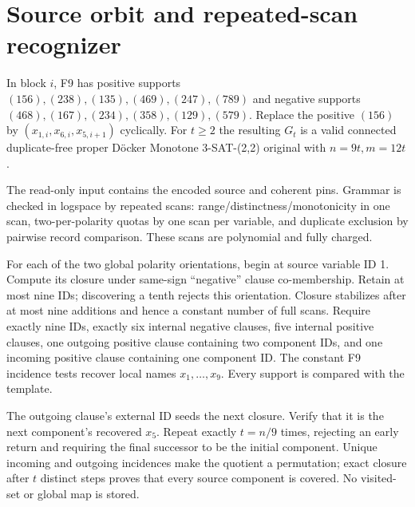 \documentclass[11pt]{article}
\begin{document}
\section{Source orbit and repeated-scan recognizer}
In block $i$, F9 has positive supports
$(156),(238),(135),(469),(247),(789)$ and negative supports
$(468),(167),(234),(358),(129),(579)$.  Replace the positive $(156)$ by
$(x_{1,i},x_{6,i},x_{5,i+1})$ cyclically.  For $t\ge2$ the resulting $G_t$
is a valid connected duplicate-free proper D\"ocker Monotone 3-SAT-(2,2)
original with $n=9t,m=12t$.

The read-only input contains the encoded source and coherent pins.  Grammar is
checked in logspace by repeated scans: range/distinctness/monotonicity in one scan,
two-per-polarity quotas by one scan per variable, and duplicate exclusion by
pairwise record comparison.  These scans are polynomial and fully charged.

For each of the two global polarity orientations, begin at source variable ID 1.
Compute its closure under same-sign ``negative'' clause co-membership.  Retain at
most nine IDs; discovering a tenth rejects this orientation.  Closure stabilizes
after at most nine additions and hence a constant number of full scans.  Require
exactly nine IDs, exactly six internal negative clauses, five internal positive
clauses, one outgoing positive clause containing two component IDs, and one
incoming positive clause containing one component ID.  The constant F9 incidence
tests recover local names $x_1,\ldots,x_9$.  Every support is compared with the
template.

The outgoing clause's external ID seeds the next closure.  Verify that it is the
next component's recovered $x_5$.  Repeat exactly $t=n/9$ times, rejecting an
early return and requiring the final successor to be the initial component.
Unique incoming and outgoing incidences make the quotient a permutation; exact
closure after $t$ distinct steps proves that every source component is covered.
No visited-set or global map is stored.
\end{document}
